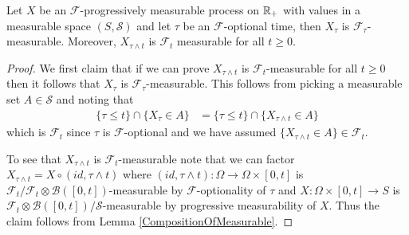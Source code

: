 \begin{lem}\label{StoppedProgressivelyMeasurableProcess}Let $X$ be an $\mathcal{F}$-progressively measurable process on
  $\mathbb{R}_+$ with values in a measurable space $(S, \mathcal{S})$ and
  let $\tau$ be an $\mathcal{F}$-optional time, then $X_\tau$ is
  $\mathcal{F}_\tau$-measurable.  Moreover, $X_{\tau \wedge t}$ is
  $\mathcal{F}_t$ measurable for all $t \geq 0$.
\end{lem}
\begin{proof}
We first claim that if we can prove $X_{\tau \wedge t}$ is
$\mathcal{F}_t$-measurable for all $t \geq 0$ then it follows that
$X_\tau$ is $\mathcal{F}_\tau$-measurable.  This follows from picking
a measurable set $A \in \mathcal{S}$ and noting that
\begin{align*}
\lbrace \tau \leq t \rbrace \cap \lbrace X_\tau \in A \rbrace &=
\lbrace \tau \leq t \rbrace \cap \lbrace X_{\tau \wedge t} \in A \rbrace
\end{align*}
which is $\mathcal{F}_t$ since $\tau$ is $\mathcal{F}$-optional and we
have assumed $\lbrace X_{\tau \wedge t} \in A \rbrace \in
\mathcal{F}_t$.

To see that $X_{\tau \wedge t}$ is $\mathcal{F}_t$-measurable note
that we can factor $X_{\tau \wedge t} = X \circ (id, \tau \wedge t)$ where
$(id, \tau \wedge t) : \Omega \to \Omega \times [0,t]$ is
$\mathcal{F}_t / \mathcal{F}_t \otimes \mathcal{B}([0,t])$-measurable
by $\mathcal{F}$-optionality of $\tau$ and $X :  \Omega \times [0,t]
\to S$ is $\mathcal{F}_t \otimes
\mathcal{B}([0,t])/\mathcal{S}$-measurable by progressive
measurability of $X$.  Thus the claim follows from Lemma \ref{CompositionOfMeasurable}.
\end{proof}